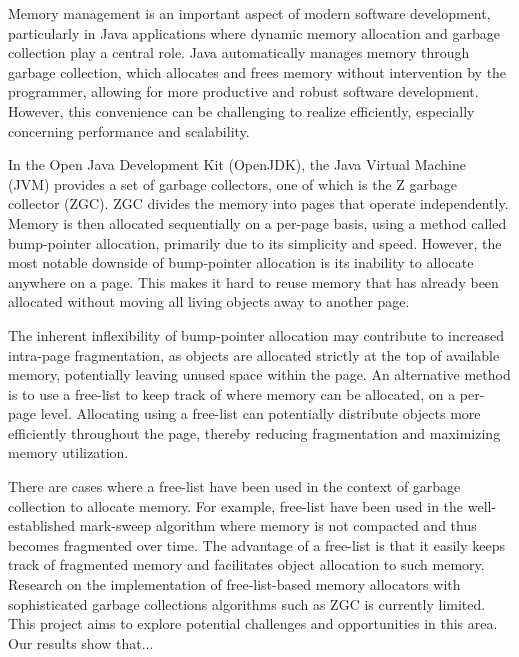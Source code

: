 
Memory management is an important aspect of modern software development, particularly in Java applications where dynamic memory allocation and garbage collection play a central role. Java automatically manages memory through garbage collection, which allocates and frees memory without intervention by the programmer, allowing for more productive and robust software development. However, this convenience can be challenging to realize efficiently, especially concerning performance and scalability. 

In the Open Java Development Kit (OpenJDK), the Java Virtual Machine (JVM) provides a set of garbage collectors, one of which is the Z garbage collector (ZGC). ZGC divides the memory into pages that operate independently. Memory is then allocated sequentially on a per-page basis, using a method called bump-pointer allocation, primarily due to its simplicity and speed. However, the most notable downside of bump-pointer allocation is its inability to allocate anywhere on a page. This makes it hard to reuse memory that has already been allocated without moving all living objects away to another page. 


The inherent inflexibility of bump-pointer allocation may contribute to increased intra-page fragmentation, as objects are allocated strictly at the top of available memory, potentially leaving unused space within the page. An alternative method is to use a free-list to keep track of where memory can be allocated, on a per-page level. Allocating using a free-list can potentially distribute objects more efficiently throughout the page, thereby reducing fragmentation and maximizing memory utilization.

There are cases where a free-list have been used in the context of garbage collection to allocate memory. For example, free-list have been used in the well-established mark-sweep algorithm where memory is not compacted and thus becomes fragmented over time. The advantage of a free-list is that it easily keeps track of fragmented memory and facilitates object allocation to such memory. Research on the implementation of free-list-based memory allocators with sophisticated garbage collections algorithms such as ZGC is currently limited. This project aims to explore potential challenges and opportunities in this area. Our results show that...



